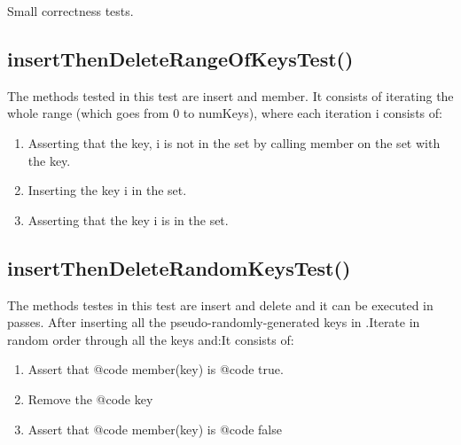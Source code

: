 \begin{table}[H]
\centering

\caption[Small correctness tests]{Small correctness tests.}
\label{tab:smallCorrectnessTests}
\end{table}

\subsection{{\ttfamily insertThenDeleteRangeOfKeysTest()}}

The methods tested in this test are {\ttfamily insert} and {\ttfamily member}. It consists of iterating the whole range (which goes from $0$ to {\ttfamily numKeys}), where each iteration {\ttfamily i} consists of:
\begin{enumerate}
    \item
    Asserting that the key, {\ttfamily i} is not in the set by calling {\ttfamily member} on the set with the key.
    \item
    Inserting the key {\ttfamily i} in the set.
    \item
    Asserting that the key {\ttfamily i} is in the set.
\end{enumerate}

\subsection{{\ttfamily insertThenDeleteRandomKeysTest()}}

The methods testes in this test are {\ttfamily insert} and {\ttfamily delete} and it can be executed in passes. After inserting all the pseudo-randomly-generated keys in .Iterate in random order through all the keys and:It consists of:
\begin{enumerate}
    \item Assert that {@code member(key)} is {@code true}.
    \item Remove the {@code key}
    \item Assert that {@code member(key)} is {@code false}
\end{enumerate}

